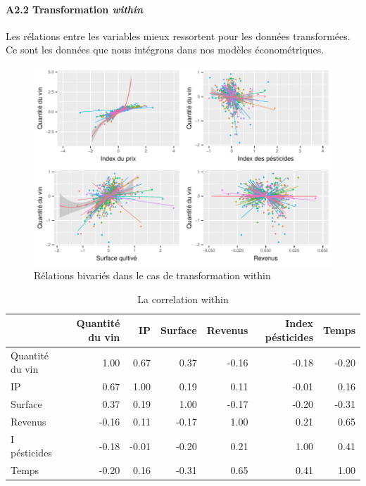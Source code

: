 \documentclass[11pt,]{article}
\let\oldparagraph\paragraph
\renewcommand{\paragraph}[1]{\oldparagraph{#1}\mbox{}}
\begin{document}
\FloatBarrier

\newpage

\hypertarget{a2.2-transformation-within}{%
\paragraph{\texorpdfstring{A2.2 Transformation
\emph{within}}{A2.2 Transformation within}}\label{a2.2-transformation-within}}

Les rélations entre les variables mieux ressortent pour les données
transformées. Ce sont les données que nous intégrons dans nos modèles
économétriques.

\FloatBarrier

\begin{figure}[!htbp]

{\centering \includegraphics{note2pres_files/figure-latex/unnamed-chunk-55-1} 

}

\caption{Rélations bivariés dans le cas de transformation within}\label{fig:unnamed-chunk-55}
\end{figure}

\FloatBarrier

\FloatBarrier

\begin{table}[ht]
\centering
\begin{tabular}{l|rrrrrr}
  \hline
 & Quantité du vin & IP & Surface & Revenus & Index pésticides & Temps \\ 
  \hline
Quantité du vin & 1.00 & 0.67 & 0.37 & -0.16 & -0.18 & -0.20 \\ 
  IP & 0.67 & 1.00 & 0.19 & 0.11 & -0.01 & 0.16 \\ 
  Surface & 0.37 & 0.19 & 1.00 & -0.17 & -0.20 & -0.31 \\ 
  Revenus & -0.16 & 0.11 & -0.17 & 1.00 & 0.21 & 0.65 \\ 
  I pésticides & -0.18 & -0.01 & -0.20 & 0.21 & 1.00 & 0.41 \\ 
  Temps & -0.20 & 0.16 & -0.31 & 0.65 & 0.41 & 1.00 \\ 
   \hline
\end{tabular}
\caption{La correlation within} 
\end{table}
\end{document}
